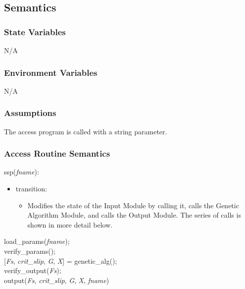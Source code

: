 \documentclass[12pt, titlepage]{article}
\begin{document}
\subsection{Semantics}

\subsubsection{State Variables}

N/A

\subsubsection{Environment Variables}

N/A

\subsubsection{Assumptions}

The access program is called with a string parameter.

\subsubsection{Access Routine Semantics}

ssp(\textit{fname}):
\begin{itemize}
	\item transition: 
	\begin{itemize}
		\item[] Modifies the state of the Input Module by calling it, calls the 
		Genetic Algorithm Module, and calls the Output Module. The series of 
		calls is shown in more detail below.
	\end{itemize}
\end{itemize}

load\_params(\textit{fname});\\

verify\_params();\\

[\textit{Fs}, \textit{crit\_slip}, \textit{G}, \textit{X}] = genetic\_alg();\\

verify\_output(\textit{Fs});\\

output(\textit{Fs}, \textit{crit\_slip}, \textit{G}, \textit{X}, 
\textit{fname})\\

\end{document}
